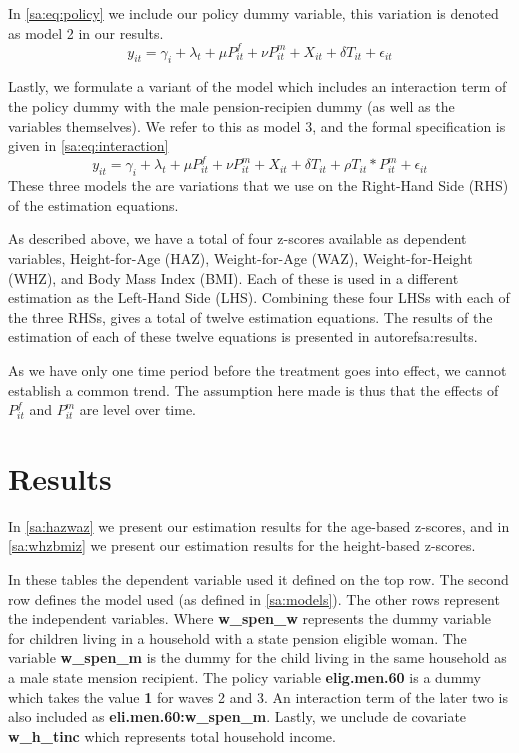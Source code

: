 \begin{refsection}
In \autoref{sa:eq:policy} we include our policy dummy variable, this variation is denoted as model 2 in our results.
\begin{equation}
\label{sa:eq:policy}
y_{it} = \gamma_i + \lambda_t + \mu P^f_{it} + \nu P^m_{it} + X_{it} + \delta T_{it} + \epsilon_{it}
\end{equation}

Lastly, we formulate a variant of the model which includes an interaction term of the policy dummy with the male pension-recipien dummy
(as well as the variables themselves).
We refer to this as model 3, and the formal specification is given in \autoref{sa:eq:interaction}
\begin{equation}
\label{sa:eq:interaction}
y_{it} = \gamma_i + \lambda_t + \mu P^f_{it} + \nu P^m_{it} + X_{it} + \delta T_{it} + \rho T_{it}*P^m_{it} + \epsilon_{it}
\end{equation}
These three models the are variations that we use on the Right-Hand Side (RHS) of the estimation equations.

As described above, we have a total of four z-scores available as dependent variables, Height-for-Age (HAZ), Weight-for-Age (WAZ), Weight-for-Height (WHZ), and Body Mass Index (BMI). Each of these is used in a different estimation as the Left-Hand Side (LHS).
Combining these four LHSs with each of the three RHSs, gives a total of twelve estimation equations.
The results of the estimation of each of these twelve equations is presented in autoref{sa:results}.

As we have only one time period before the treatment goes into effect,
we cannot establish a common trend.
The assumption here made is thus that the effects of $P^f_{it}$ and $P^m_{it}$ are level over time.


\section{Results}
\label{sa:results}
In \autoref{sa:hazwaz} we present our estimation results for the age-based z-scores,
and in \autoref{sa:whzbmiz} we present our estimation results for the height-based z-scores.

In these tables the dependent variable used it defined on the top row.
The second row defines the model used (as defined in \autoref{sa:models}).
The other rows represent the independent variables.
Where \textbf{w\_spen\_w} represents the dummy variable for children living in a household with a state pension eligible woman.
The variable \textbf{w\_spen\_m} is the dummy for the child living in the same household as a male state mension recipient.
The policy variable \textbf{elig.men.60} is a dummy which takes the value \textbf{1} for waves 2 and 3.
An interaction term of the later two is also included as \textbf{eli.men.60:w\_spen\_m}.
Lastly, we unclude de covariate \textbf{w\_h\_tinc} which represents total household income.


\end{refsection}
